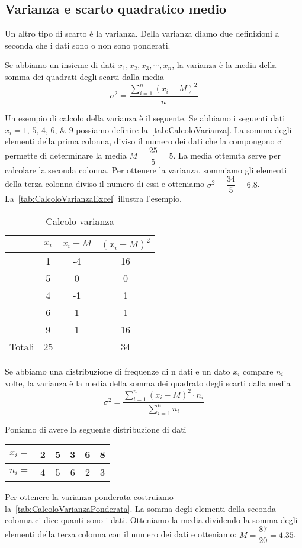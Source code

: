 \subsection{Varianza e scarto quadratico medio}
Un altro tipo di scarto è la varianza. Della varianza diamo due definizioni a seconda che i dati sono o non sono ponderati.
\begin{defn}[Varianza]
Se abbiamo un insieme di dati $x_{1},x_{2},x_{3},\cdots,x_{n}$, la varianza  è la media della somma dei quadrati degli scarti dalla media\[\sigma^{2}=\dfrac{\sum_{i=1}^{n}(x_{i}-M)^2}{n}  \] 
\end{defn}
Un esempio di calcolo della varianza è il seguente. 
Se abbiamo i seguenti dati $x_{i}=\numlist{1;5;4;6;9}$ possiamo definire la~\vref{tab:CalcoloVarianza}. La somma degli elementi della prima colonna, diviso il numero dei dati che la compongono ci permette  di determinare la media $M=\dfrac{\num{25}}{\num{5}}=\num{5}$. 
La media ottenuta serve per  calcolare la seconda colonna. Per ottenere la varianza, sommiamo gli elementi della terza colonna diviso il numero di essi e otteniamo $\sigma^2=\dfrac{34}{5}=\num{6,8}$. La~\vref{tab:CalcoloVarianzaExcel} illustra l'esempio.
\begin{table}
	\centering
	\begin{tabular}{l*{3}{S[table-format=2.0]}}
		\toprule
		& {$x_i$} & {$x_i-M$} &{$(x_i-M )^2$}  \\ 
		\midrule
			&  1& -4 & 16 \\ 
			&  5&  0&  0\\ 
			&  4&  -1&  1\\ 
			&  6&  1&  1\\ 
			&  9&  1&  16\\ 
		\midrule
	{Totali}	& 25 &  &34  \\ 
		\bottomrule
	\end{tabular} 
	\caption{Calcolo varianza}
	\label{tab:CalcoloVarianza}
\end{table}
\begin{defn}
		Se abbiamo una distribuzione di frequenze di n dati e un dato $x_{i}$ compare $n_{i}$ volte, la varianza  è la media della somma dei quadrato degli scarti dalla media\[\sigma^{2}=\dfrac{\sum_{i=1}^{n}(x_{i}-M)^{2}\cdot n_{i}}{\sum_{i=1}^{n} n_{i}}\] 
\end{defn}
Poniamo di avere la seguente distribuzione di dati
\begin{center}
	\begin{tabular}{l*{5} {S[table-format=1.0]}}
		{$x_{i}=$}	&2  &5  &3  &6  &8 \\
		\midrule 
		{$n_{i}=$}	& 4 &5  & 6 & 2 & 3\\   
	\end{tabular}
\end{center}
Per ottenere la varianza ponderata costruiamo la~\vref{tab:CalcoloVarianzaPonderata}. La somma degli elementi della seconda colonna ci dice quanti sono i dati. Otteniamo la media dividendo la somma degli elementi della terza colonna con il numero dei dati e otteniamo: $M=\dfrac{87}{20}=\num{4.35}$. 

